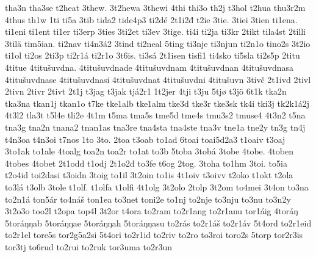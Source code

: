 {    tha3n
    tha3se
    t2heat
    3thew.
    3t2hewa
    3thewi
    4thi
    thi3o
    th2j
    t3hol
    t2hua
    thu3r2m
    4thus
    th1w
    1ti
    ti5a
    3tib
    tida2
    tide4p3
    ti2dé
    2t1i2đ
    t2ie
    3tie.
    3tiei
    3tien
    ti1ena.
    ti1eni
    ti1ent
    ti1er
    ti3erp
    3ties
    3ti2et
    ti3ev
    3tige.
    ti4i
    ti2ja
    ti3kr
    2tikt
    tila4st
    2tilli
    3tilä
    tim5ian.
    ti2nav
    ti4n3á2
    3tind
    ti2neal
    5ting
    ti3nje
    ti3njun
    ti2n1o
    tino2s
    3t2io
    ti1ol
    ti2os
    2ti3p
    ti2r1á
    ti2r1o
    3t6is.
    ti3sá
    2t1isen
    tisfi1
    ti4sko
    ti5sla
    ti2s5p
    2titu
    4titue
    4titušuvdna.
    4titušuvdnade
    4titušuvdnam
    4titušuvdnan
    4titušuvdnasa
    4titušuvdnase
    4titušuvdnasi
    4titušuvdnat
    4titušuvdni
    4titušuvn
    3tivč
    2t1ivd
    2tivl
    2tivn
    2tivr
    2tivt
    2t1j
    t3jag
    t3jak
    tjá2r1
    1t2jer
    4tji
    t3ju
    5tjø
    t3jö
    6t1k
    tka2n
    tka3na
    tkan1j
    tkan1o
    t7ke
    tke1alb
    tke1alm
    tke3d
    tke3r
    tke3sk
    tk4i
    tki3j
    tk2k1á2j
    4t3l2
    tla3t
    t5l4e
    tli2e
    4t1m
    t5ma
    tma5s
    tme5d
    tme4s
    tmu3s2
    tmuse4
    4t3n2
    t5na
    tna3g
    tna2n
    tnana2
    tnan1as
    tna3re
    tna4sta
    tna4ste
    tna3v
    tne1a
    tne2y
    tn3g
    tn4j
    t4n3oa
    t4n3oi
    t7nos
    1to
    3to.
    2toa
    t3oab
    to1ad
    6toai
    toai5d2a3
    t1oaiv
    t3oaj
    3to1ak
    to1ale
    4toalg
    toa2n
    toa2r
    to1at
    to3b
    5toba
    3tobá
    3tobe
    4tobe.
    4toben
    4tobes
    4tobet
    2t1odd
    t1odj
    2t1o2đ
    to3fe
    t6og
    2tog.
    3toha
    to1hm
    3toi.
    to5ia
    t2o4id
    toi2dasi
    t3oidn
    3toig
    to1il
    3t2oin
    to1is
    4t1oiv
    t3oivv
    t2oko
    t1okt
    t2ola
    to3lá
    t3olb
    3tole
    t1olf.
    t1olfa
    t1olfi
    4t1olg
    3t2olo
    2tolp
    3t2om
    to4mei
    3t4on
    to3na
    to2n1á
    ton5ár
    to4náš
    ton1ea
    to3net
    toni2e
    to1nj
    to2nje
    to3nju
    to3nu
    to3n2y
    3t2o3o
    too2l
    t2opa
    top4l
    3t2or
    t4ora
    to2ram
    to2r1ang
    to2r1anu
    tor1áig
    4toráŋ
    5toráŋŋab
    5toráŋŋae
    5toráŋŋah
    5toráŋŋasu
    to2rás
    to2r1áš
    to2r1áv
    5t4ord
    to2r1eid
    to2r1el
    tore5s
    tor2g5a2si
    5t4ori
    to2r1id
    to2riv
    to2ro
    to3roi
    toro2s
    5torp
    tor2r3is
    tor3tj
    to6rud
    to2rui
    to2ruk
    tor3uma
    to2r3un
}
